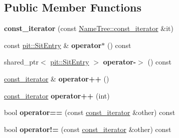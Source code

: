 \subsection*{Public Member Functions}
\begin{DoxyCompactItemize}
\item 
{\bfseries const\+\_\+iterator} (const \hyperlink{classnfd_1_1NameTree_1_1const__iterator}{Name\+Tree\+::const\+\_\+iterator} \&it)\hypertarget{classnfd_1_1Sit_1_1const__iterator_a5d07abdbb19b9ba44ebbda379c754479}{}\label{classnfd_1_1Sit_1_1const__iterator_a5d07abdbb19b9ba44ebbda379c754479}

\item 
const \hyperlink{classnfd_1_1pit_1_1SitEntry}{pit\+::\+Sit\+Entry} \& {\bfseries operator$\ast$} () const\hypertarget{classnfd_1_1Sit_1_1const__iterator_abb5539327cef512d89bb2b842035279d}{}\label{classnfd_1_1Sit_1_1const__iterator_abb5539327cef512d89bb2b842035279d}

\item 
shared\+\_\+ptr$<$ \hyperlink{classnfd_1_1pit_1_1SitEntry}{pit\+::\+Sit\+Entry} $>$ {\bfseries operator-\/$>$} () const\hypertarget{classnfd_1_1Sit_1_1const__iterator_a6db875ee09e664b455db07b64ae92e41}{}\label{classnfd_1_1Sit_1_1const__iterator_a6db875ee09e664b455db07b64ae92e41}

\item 
\hyperlink{classnfd_1_1Sit_1_1const__iterator}{const\+\_\+iterator} \& {\bfseries operator++} ()\hypertarget{classnfd_1_1Sit_1_1const__iterator_a38f8eae3454cf676cab4546dea1f2ff5}{}\label{classnfd_1_1Sit_1_1const__iterator_a38f8eae3454cf676cab4546dea1f2ff5}

\item 
\hyperlink{classnfd_1_1Sit_1_1const__iterator}{const\+\_\+iterator} {\bfseries operator++} (int)\hypertarget{classnfd_1_1Sit_1_1const__iterator_a61e165df2230b4a1701075ca8fb9b05e}{}\label{classnfd_1_1Sit_1_1const__iterator_a61e165df2230b4a1701075ca8fb9b05e}

\item 
bool {\bfseries operator==} (const \hyperlink{classnfd_1_1Sit_1_1const__iterator}{const\+\_\+iterator} \&other) const\hypertarget{classnfd_1_1Sit_1_1const__iterator_a221552286f1d75e426d3293f4942180b}{}\label{classnfd_1_1Sit_1_1const__iterator_a221552286f1d75e426d3293f4942180b}

\item 
bool {\bfseries operator!=} (const \hyperlink{classnfd_1_1Sit_1_1const__iterator}{const\+\_\+iterator} \&other) const\hypertarget{classnfd_1_1Sit_1_1const__iterator_ad7f5f0368c408200ba81ba6037abe776}{}\label{classnfd_1_1Sit_1_1const__iterator_ad7f5f0368c408200ba81ba6037abe776}

\end{DoxyCompactItemize}



